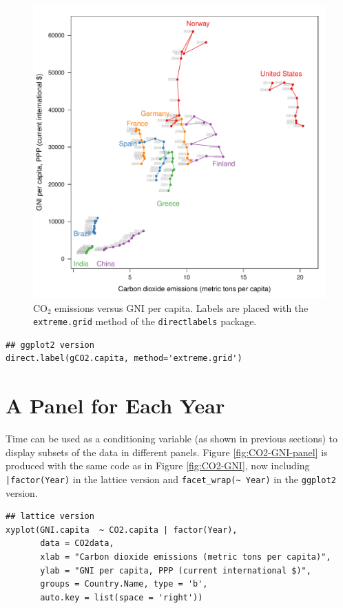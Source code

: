 \documentclass[smallroyalvopaper]{memoir}
\begin{document}
\begin{figure}[htbp]
\centering
\includegraphics[width=.9\linewidth]{figs/CO2_capitaDL.pdf}
\caption{\(\mathrm{CO_2}\) emissions versus GNI per capita. Labels are placed with the \texttt{extreme.grid} method of the \texttt{directlabels} package. \label{fig:CO2-GNI-DL}}
\end{figure}

\lstset{language=r,label= ,caption= ,captionpos=b,numbers=none}
\begin{lstlisting}
## ggplot2 version
direct.label(gCO2.capita, method='extreme.grid')
\end{lstlisting}

\section{A Panel for Each Year}
\label{sec:org1bc2de8}
Time can be used as a conditioning variable (as shown in previous
sections) to display subsets of the data in different panels. Figure
\ref{fig:CO2-GNI-panel} is produced with the same code as in Figure
\ref{fig:CO2-GNI}, now including \texttt{|factor(Year)} in the lattice
version and \texttt{facet\_wrap(\textasciitilde{} Year)} in the \texttt{ggplot2} version.

\lstset{language=r,label= ,caption= ,captionpos=b,numbers=none}
\begin{lstlisting}
## lattice version
xyplot(GNI.capita  ~ CO2.capita | factor(Year),
       data = CO2data,
       xlab = "Carbon dioxide emissions (metric tons per capita)",
       ylab = "GNI per capita, PPP (current international $)",
       groups = Country.Name, type = 'b',
       auto.key = list(space = 'right'))
\end{lstlisting}
\end{document}
